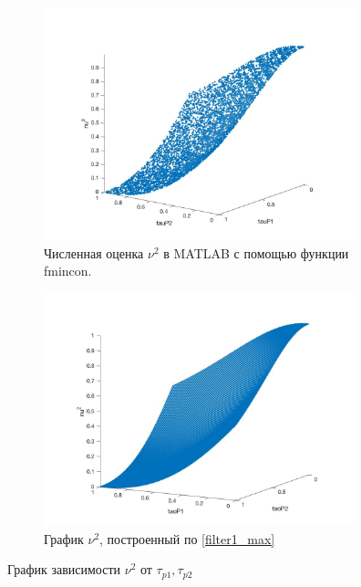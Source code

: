 \documentclass[a4paper,14pt]{article} %
\begin{document}
\begin{figure}[H]
\begin{subfigure}{.5\textwidth}
  \includegraphics[width=9cm]{images/filter1e.jpg}
  \caption{Численная оценка $\nu^2$ в MATLAB с помощью функции fmincon.}
  \label{fig:sub1}
\end{subfigure}%
\begin{subfigure}{.5\textwidth}
\includegraphics[width=9cm]{images/filter1_1.jpg}
  \caption{График $\nu^2$, построенный по \eqref{filter1_max}}
  \label{fig:sub2}
\end{subfigure}
\caption{График зависимости $\nu^2$ от $\tau_{p1}, \tau_{p2}$}
\label{fig:filter1_fig}
\end{figure}

\pagebreak
\end{document}

